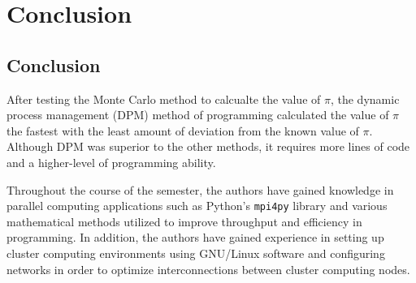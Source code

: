 
\chapter{Conclusion} %

\label{Chapter3} %


\section{Conclusion}

After testing the Monte Carlo method to calcualte the value of $\pi$, the dynamic process management (DPM) method of programming calculated the value of $\pi$ the fastest with the least amount of deviation from the known value of $\pi$. Although DPM was superior to the other methods, it requires more lines of code and a higher-level of programming ability. 

Throughout the course of the semester, the authors have gained knowledge in parallel computing applications such as Python's \texttt{mpi4py} library and various mathematical methods utilized to improve throughput and efficiency in programming. In addition, the authors have gained experience in setting up cluster computing environments using GNU/Linux software and configuring networks in order to optimize interconnections between cluster computing nodes. 

